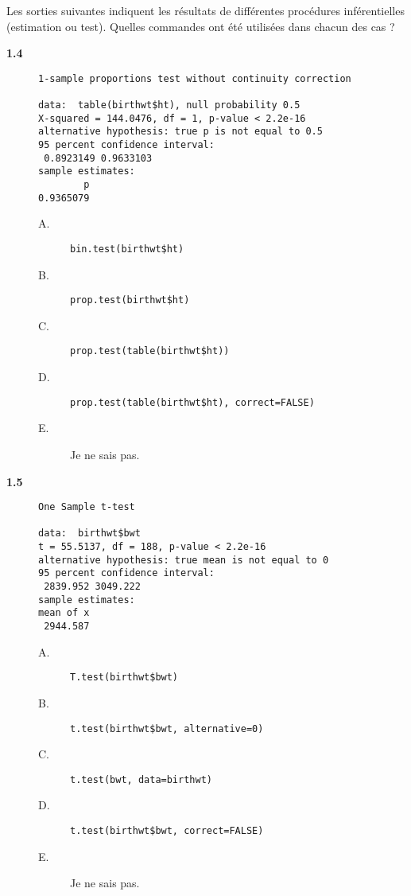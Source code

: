 \documentclass[11pt]{report}
\theoremstyle{definition}
\begin{document}
Les sorties suivantes indiquent les résultats de différentes
procédures inférentielles (estimation ou test). Quelles commandes ont été
utilisées dans chacun des cas ? 
\begin{description}
\item[\bf 1.4] 
\begin{Verbatim}[frame=single]
	1-sample proportions test without continuity correction

data:  table(birthwt$ht), null probability 0.5 
X-squared = 144.0476, df = 1, p-value < 2.2e-16
alternative hypothesis: true p is not equal to 0.5 
95 percent confidence interval:
 0.8923149 0.9633103 
sample estimates:
        p 
0.9365079 
\end{Verbatim}
  \begin{description}
  \item[A.] \verb|bin.test(birthwt$ht)|
  \item[B.] \verb|prop.test(birthwt$ht)|
  \item[C.] \verb|prop.test(table(birthwt$ht))|
  \item[D.] \verb|prop.test(table(birthwt$ht), correct=FALSE)|
  \item[E.] Je ne sais pas.
  \end{description}  
\item[\bf 1.5] 
\begin{Verbatim}[frame=single]
  	One Sample t-test

data:  birthwt$bwt 
t = 55.5137, df = 188, p-value < 2.2e-16
alternative hypothesis: true mean is not equal to 0 
95 percent confidence interval:
 2839.952 3049.222 
sample estimates:
mean of x 
 2944.587 
\end{Verbatim}
  \begin{description}
  \item[A.] \verb|T.test(birthwt$bwt)|
  \item[B.] \verb|t.test(birthwt$bwt, alternative=0)|
  \item[C.] \verb|t.test(bwt, data=birthwt)|
  \item[D.] \verb|t.test(birthwt$bwt, correct=FALSE)|
  \item[E.] Je ne sais pas.
  \end{description}  
\end{description}
\end{document}
